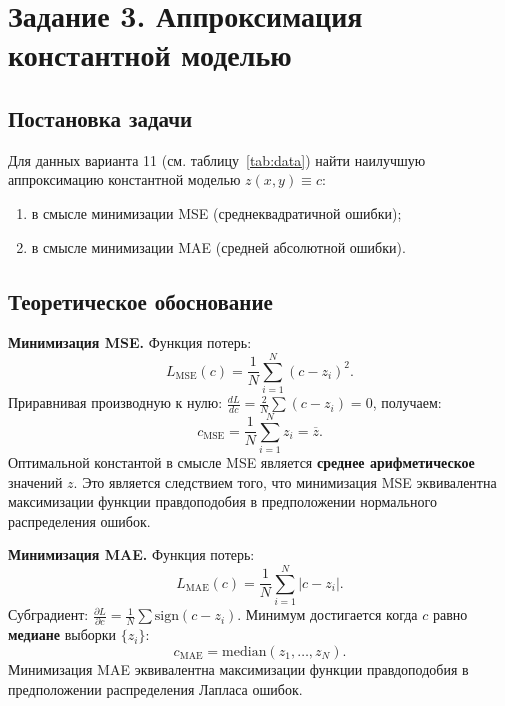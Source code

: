 \section{Задание 3. Аппроксимация константной моделью}

\subsection{Постановка задачи}

Для данных варианта 11 (см. таблицу~\ref{tab:data}) найти наилучшую аппроксимацию константной моделью $z(x, y) \equiv c$:
\begin{enumerate}
    \item в смысле минимизации MSE (среднеквадратичной ошибки);
    \item в смысле минимизации MAE (средней абсолютной ошибки).
\end{enumerate}

\subsection{Теоретическое обоснование}

\textbf{Минимизация MSE.} Функция потерь:
\begin{equation}
    L_{\text{MSE}}(c) = \frac{1}{N}\sum_{i=1}^{N}(c - z_i)^2.
\end{equation}
Приравнивая производную к нулю: $\frac{dL}{dc} = \frac{2}{N}\sum(c - z_i) = 0$, получаем:
\begin{equation}
    c_{\text{MSE}} = \frac{1}{N}\sum_{i=1}^{N} z_i = \overline{z}.
\end{equation}
Оптимальной константой в смысле MSE является \textbf{среднее арифметическое} значений $z$. Это является следствием того, что минимизация MSE эквивалентна максимизации функции правдоподобия в предположении нормального распределения ошибок.

\textbf{Минимизация MAE.} Функция потерь:
\begin{equation}
    L_{\text{MAE}}(c) = \frac{1}{N}\sum_{i=1}^{N}|c - z_i|.
\end{equation}
Субградиент: $\frac{\partial L}{\partial c} = \frac{1}{N}\sum \text{sign}(c - z_i)$. Минимум достигается когда $c$ равно \textbf{медиане} выборки $\{z_i\}$:
\begin{equation}
    c_{\text{MAE}} = \text{median}(z_1, \ldots, z_N).
\end{equation}
Минимизация MAE эквивалентна максимизации функции правдоподобия в предположении распределения Лапласа ошибок.

